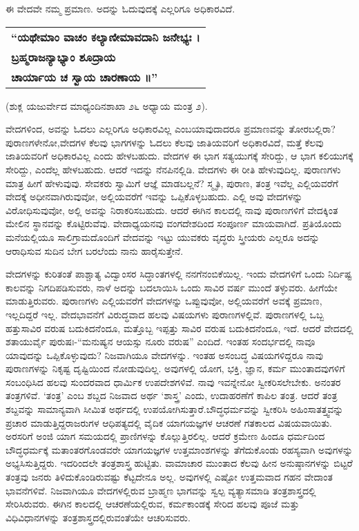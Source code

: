 ಈ ವೇದವೇ ನಮ್ಮ ಪ್ರಮಾಣ. ಅದನ್ನು ಓದುವುದಕ್ಕೆ ಎಲ್ಲರಿಗೂ ಅಧಿಕಾರವಿದೆ.

\smallskip

\begin{longtable}{@{\hspace{-10pt}}l@{}}
\textbf{“ಯಥೇಮಾಂ ವಾಚಂ ಕಲ್ಯಾಣೀಮಾವದಾನಿ ಜನೇಭ್ಯಃ ।} \\
\textbf{ಬ್ರಹ್ಮರಾಜನ್ಯಾಭ್ಯಾಂ ಶೂದ್ರಾಯ} \\
\textbf{ಚಾರ್ಯಾಯ ಚ ಸ್ವಾಯ ಚಾರಣಾಯ ॥”} \\
\end{longtable}

\hfill (ಶುಕ್ಲ ಯಜುರ್ವೇದ ಮಾಧ್ಯಂದಿನಶಾಖಾ ೨೬ ಅಧ್ಯಾಯ ಮಂತ್ರ ೨).

\smallskip

ವೇದಗಳಿಂದ, ಅವನ್ನು ಓದಲು ಎಲ್ಲರಿಗೂ ಅಧಿಕಾರವಿಲ್ಲ ಎಂಬ\break ಯಾವುದಾದರೂ ಪ್ರಮಾಣವನ್ನು ತೋರಬಲ್ಲಿರಾ? ಪುರಾಣಗಳೇನೋ,\break ವೇದಗಳ ಕೆಲವು ಭಾಗಗಳನ್ನು ಓದಲು ಕೆಲವು ಜಾತಿಯವರಿಗೆ ಅಧಿಕಾರವಿದೆ, ಮತ್ತೆ ಕೆಲವು ಜಾತಿಯವರಿಗೆ ಅಧಿಕಾರವಿಲ್ಲ ಎಂದು ಹೇಳಬಹುದು. ವೇದಗಳ ಈ ಭಾಗ ಸತ್ಯಯುಗಕ್ಕೆ ಸೇರಿದ್ದು, ಆ ಭಾಗ ಕಲಿಯುಗಕ್ಕೆ ಸೇರಿದ್ದು, ಎಂದೆಲ್ಲ ಹೇಳಬಹುದು. ಆದರೆ ಇದನ್ನು ನೆನಪಿನಲ್ಲಿಡಿ. ವೇದಗಳು ಈ ರೀತಿ ಹೇಳುವು\-ದಿಲ್ಲ. ಪುರಾಣಗಳು ಮಾತ್ರ ಹೀಗೆ ಹೇಳುವುವು. ಸೇವಕರು ಸ್ವಾಮಿಗೆ ಆಜ್ಞೆ ಮಾಡಬಲ್ಲನೆ? ಸ್ಮೃತಿ, ಪುರಾಣ, ತಂತ್ರ ಇವೆಲ್ಲ ಎಲ್ಲಿಯವರೆಗೆ ವೇದಕ್ಕೆ ಅಧೀನವಾಗಿರುವುವೋ, ಅಲ್ಲಿಯವರೆಗೆ ಇವನ್ನು ಒಪ್ಪಿಕೊಳ್ಳಬಹುದು. ಎಲ್ಲಿ ಅವು ವೇದಗಳನ್ನು ವಿರೋಧಿಸುವುವೋ, ಅಲ್ಲಿ ಅವನ್ನು ನಿರಾಕರಿಸಬಹುದು. ಆದರೆ ಈಗಿನ ಕಾಲದಲ್ಲಿ ನಾವು ಪುರಾಣಗಳಿಗೆ ವೇದಕ್ಕಿಂತ ಮೇಲಿನ ಸ್ಥಾನವನ್ನು ಕೊಟ್ಟಿರುವೆವು. ವೇದಾಧ್ಯಯನವು ವಂಗದೇಶದಿಂದ ಸಂಪೂರ್ಣ ಮಾಯವಾಗಿದೆ. ಪ್ರತಿಯೊಂದು ಮನೆಯಲ್ಲಿಯೂ ಸಾಲಿಗ್ರಾಮದೊಂದಿಗೆ ವೇದವನ್ನು ಇಟ್ಟು ಯುವಕರು ವೃದ್ಧರು ಸ್ತ್ರೀಯರು ಎಲ್ಲರೂ ಅದನ್ನು ಆರಾಧಿಸುವ ಸುದಿನ ಬೇಗ ಬರಲೆಂದು ನಾನು ಹಾರೈಸುತ್ತೇನೆ.

ವೇದಗಳನ್ನು ಕುರಿತಂತೆ ಪಾಶ್ಚಾತ್ಯ ವಿದ್ವಾಂಸರ ಸಿದ್ಧಾಂತಗಳಲ್ಲಿ ನನಗೆ\break ನಂಬಿಕೆಯಿಲ್ಲ. ಇಂದು ವೇದಗಳಿಗೆ ಒಂದು ನಿರ್ದಿಷ್ಟ ಕಾಲವನ್ನು ನಿಗದಿಪಡಿಸುವರು, ನಾಳೆ ಅದನ್ನು ಬದಲಾಯಿಸಿ ಒಂದು ಸಾವಿರ ವರ್ಷ ಮುಂದೆ ತಳ್ಳುವರು. ಹೀಗೆಯೇ ಮಾಡುತ್ತಿರುವರು. ಪುರಾಣಗಳು ಎಲ್ಲಿಯವರೆಗೆ ವೇದಗಳನ್ನು ಒಪ್ಪುವುವೋ, ಅಲ್ಲಿಯವರೆಗೆ ಅವಕ್ಕೆ ಪ್ರಮಾಣ, ಇಲ್ಲದಿದ್ದರೆ ಇಲ್ಲ. ವೇದಭಾವನೆಗೆ ವಿರುದ್ಧವಾದ ಹಲವು ವಿಷಯಗಳು ಪುರಾಣಗಳಲ್ಲಿವೆ. ಪುರಾಣಗಳಲ್ಲಿ ಒಬ್ಬ ಹತ್ತುಸಾವಿರ ವರುಷ ಬದುಕಿದನೆಂದೂ, ಮತ್ತೊಬ್ಬ ಇಪ್ಪತ್ತು ಸಾವಿರ ವರುಷ ಬದುಕಿದನೆಂದೂ, ಇದೆ. ಆದರೆ ವೇದದಲ್ಲಿ ಶತಾಯುರ್ವೈ ಪುರುಷಃ-\break “ಮನುಷ್ಯನ ಆಯಸ್ಸು ನೂರು ವರುಷ” ಎಂದಿದೆ. ಇಂತಹ ಸಂದರ್ಭದಲ್ಲಿ ನಾವೂ ಯಾವುದನ್ನು ಒಪ್ಪಿಕೊಳ್ಳುವುದು? ನಿಜವಾಗಿಯೂ ವೇದಗಳನ್ನು. ಇಂತಹ ಅಸಂಬದ್ಧ ವಿಷಯಗಳಿದ್ದರೂ ನಾವು ಪುರಾಣಗಳನ್ನು ನಿಕೃಷ್ಟ ದೃಷ್ಟಿಯಿಂದ ನೋಡುವುದಿಲ್ಲ. ಅವುಗಳಲ್ಲಿ ಯೋಗ, ಭಕ್ತಿ, ಜ್ಞಾನ, ಕರ್ಮ ಮುಂತಾ\-ದವುಗಳಿಗೆ ಸಂಬಂಧಿಸಿದ ಹಲವು ಸುಂದರವಾದ ಧಾರ್ಮಿಕ ಉಪದೇಶಗಳಿವೆ. ನಾವು ಇವನ್ನೇನೋ ಸ್ವೀಕರಿಸಲೇಬೇಕು. ಅನಂತರ ತಂತ್ರಗಳಿವೆ. ‘ತಂತ್ರ’ ಎಂಬ ಶಬ್ದದ ನಿಜವಾದ ಅರ್ಥ ‘ಶಾಸ್ತ್ರ’ ಎಂದು, ಉದಾಹರಣೆಗೆ ಕಾಪಿಲ ತಂತ್ರ. ಆದರೆ ತಂತ್ರ ಶಬ್ದವನ್ನು ಸಾಮಾನ್ಯವಾಗಿ ಸೀಮಿತ ಅರ್ಥದಲ್ಲಿ ಉಪಯೋಗಿಸುತ್ತಾರೆ.\break ಬೌದ್ಧಧರ್ಮವನ್ನು ಸ್ವೀಕರಿಸಿ ಅಹಿಂಸಾತತ್ತ್ವವನ್ನು ಪ್ರಚಾರ ಮಾಡುತ್ತಿದ್ದ\break ರಾಜರುಗಳ ಆಧಿಪತ್ಯದಲ್ಲಿ ವೈದಿಕ ಯಾಗಯಜ್ಞಗಳ ಆಚರಣೆ ಗತಕಾಲದ ವಿಷಯವಾಯಿತು. ಅರಸರಿಗೆ ಅಂಜಿ ಯಾಗ ಸಮಯದಲ್ಲಿ ಪ್ರಾಣಿಗಳನ್ನು ಕೊಲ್ಲುತ್ತಿರಲಿಲ್ಲ. ಆದರೆ ಕ್ರಮೇಣ ಹಿಂದೂ ಧರ್ಮದಿಂದ ಬೌದ್ಧಧರ್ಮಕ್ಕೆ ಮತಾಂತರಗೊಂಡವರೇ ಯಾಗಯಜ್ಞಗಳ ಉತ್ತಮಾಂಶಗಳನ್ನು ತೆಗೆದುಕೊಂಡು ರಹಸ್ಯವಾಗಿ ಅವುಗಳನ್ನು ಅಭ್ಯಸಿಸುತ್ತಿದ್ದರು. ಇದರಿಂದಲೇ ತಂತ್ರಶಾಸ್ತ್ರ ಹುಟ್ಟಿತು. ವಾಮಾಚಾರ ಮುಂತಾದ ಕೆಲವು ಹೀನ ಅನುಷ್ಠಾನಗಳನ್ನು ಬಿಟ್ಟರೆ ತಂತ್ರವು ಜನರು ತಿಳಿದುಕೊಂಡಿರುವಷ್ಟು ಕೆಟ್ಟದೇನೂ ಅಲ್ಲ. ಅವುಗಳಲ್ಲಿ ಎಷ್ಟೋ ಉತ್ತಮವಾದ ಗಹನ ವೇದಾಂತ ಭಾವನೆಗಳಿವೆ. ನಿಜವಾಗಿಯೂ ವೇದಗಳಲ್ಲಿರುವ ಬ್ರಾಹ್ಮಣ ಭಾಗವನ್ನು ಸ್ವಲ್ಪ ವ್ಯತ್ಯಾಸಮಾಡಿ ತಂತ್ರಶಾಸ್ತ್ರದಲ್ಲಿ ಸೇರಿಸಿರುವರು. ಈಗಿನ ಕಾಲದಲ್ಲಿ ಆಚರಣೆಯಲ್ಲಿರುವ, ಕರ್ಮಕಾಂಡಕ್ಕೆ ಸೇರಿದ ಹಲವು ಪೂಜೆ ಮತ್ತು ವಿಧಿವಿಧಾನಗಳನ್ನು ತಂತ್ರಶಾಸ್ತ್ರದಲ್ಲಿರುವಂತೆಯೇ ಆಚರಿಸುವರು.

